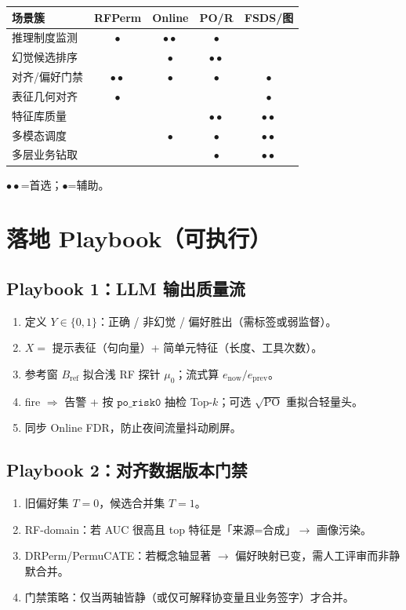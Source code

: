 \documentclass[11pt,a4paper,UTF8,fontset=none]{ctexart}
\begin{document}
\begin{center}
\begin{tabular}{@{}lcccc@{}}
\toprule
场景簇 & RFPerm & Online & PO/R & FSDS/图 \\
\midrule
推理制度监测 & \(\bullet\) & \(\bullet\!\!\bullet\) & \(\bullet\) & \\
幻觉候选排序 & & \(\bullet\) & \(\bullet\!\!\bullet\) & \\
对齐/偏好门禁 & \(\bullet\!\!\bullet\) & \(\bullet\) & \(\bullet\) & \(\bullet\) \\
表征几何对齐 & \(\bullet\) & & & \(\bullet\) \\
特征库质量 & & & \(\bullet\!\!\bullet\) & \(\bullet\!\!\bullet\) \\
多模态调度 & & \(\bullet\) & \(\bullet\) & \(\bullet\!\!\bullet\) \\
多层业务钻取 & & & \(\bullet\) & \(\bullet\!\!\bullet\) \\
\bottomrule
\end{tabular}
\end{center}
{\small \(\bullet\!\!\bullet\)=首选；\(\bullet\)=辅助。}

\section{落地 Playbook（可执行）}
\label{sec:playbook}

\subsection{Playbook 1：LLM 输出质量流}
\begin{enumerate}
  \item 定义 \(Y\in\{0,1\}\)：正确 / 非幻觉 / 偏好胜出（需标签或弱监督）。
  \item \(X=\) 提示表征（句向量）+ 简单元特征（长度、工具次数）。
  \item 参考窗 \(B_{\mathrm{ref}}\) 拟合浅 RF 探针 \(\mu_0\)；流式算 \(e_{\mathrm{now}}/e_{\mathrm{prev}}\)。
  \item fire \(\Rightarrow\) 告警 + 按 \(\texttt{po\_risk0}\) 抽检 Top-\(k\)；可选 \(\sqrt{\mathrm{PO}}\) 重拟合轻量头。
  \item 同步 Online FDR，防止夜间流量抖动刷屏。
\end{enumerate}

\subsection{Playbook 2：对齐数据版本门禁}
\begin{enumerate}
  \item 旧偏好集 \(T=0\)，候选合并集 \(T=1\)。
  \item RF-domain：若 AUC 很高且 top 特征是「来源=合成」\(\to\) 画像污染。
  \item DRPerm/PermuCATE：若概念轴显著 \(\to\) 偏好映射已变，需人工评审而非静默合并。
  \item 门禁策略：仅当两轴皆静（或仅可解释协变量且业务签字）才合并。
\end{enumerate}
\end{document}
